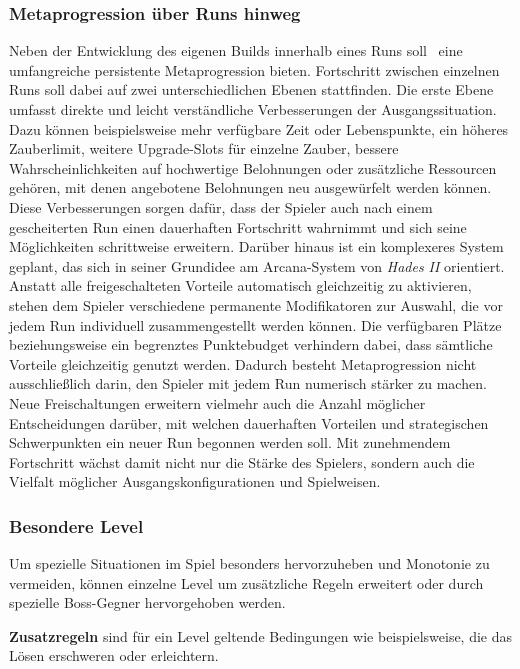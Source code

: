 \subsubsection{Metaprogression über Runs hinweg}
Neben der Entwicklung des eigenen Builds innerhalb eines Runs soll \coc\ eine umfangreiche persistente Metaprogression bieten.
Fortschritt zwischen einzelnen Runs soll dabei auf zwei unterschiedlichen Ebenen stattfinden.
Die erste Ebene umfasst direkte und leicht verständliche Verbesserungen der Ausgangssituation.
Dazu können beispielsweise mehr verfügbare Zeit oder Lebenspunkte, ein höheres Zauberlimit, weitere Upgrade-Slots für einzelne Zauber, bessere Wahrscheinlichkeiten auf hochwertige Belohnungen oder zusätzliche Ressourcen gehören, mit denen angebotene Belohnungen neu ausgewürfelt werden können.
Diese Verbesserungen sorgen dafür, dass der Spieler auch nach einem gescheiterten Run einen dauerhaften Fortschritt wahrnimmt und sich seine Möglichkeiten schrittweise erweitern.
Darüber hinaus ist ein komplexeres System geplant, das sich in seiner Grundidee am Arcana-System von \emph{Hades II} orientiert.
Anstatt alle freigeschalteten Vorteile automatisch gleichzeitig zu aktivieren, stehen dem Spieler verschiedene permanente Modifikatoren zur Auswahl, die vor jedem Run individuell zusammengestellt werden können.
Die verfügbaren Plätze beziehungsweise ein begrenztes Punktebudget verhindern dabei, dass sämtliche Vorteile gleichzeitig genutzt werden.
Dadurch besteht Metaprogression nicht ausschließlich darin, den Spieler mit jedem Run numerisch stärker zu machen.
Neue Freischaltungen erweitern vielmehr auch die Anzahl möglicher Entscheidungen darüber, mit welchen dauerhaften Vorteilen und strategischen Schwerpunkten ein neuer Run begonnen werden soll.
Mit zunehmendem Fortschritt wächst damit nicht nur die Stärke des Spielers, sondern auch die Vielfalt möglicher Ausgangskonfigurationen und Spielweisen.

\subsubsection{Besondere Level}
Um spezielle Situationen im Spiel besonders hervorzuheben und Monotonie zu vermeiden, können einzelne Level um zusätzliche Regeln erweitert oder durch spezielle Boss-Gegner hervorgehoben werden.

\textbf{Zusatzregeln} sind für ein Level geltende Bedingungen wie beispielsweise, die das Lösen erschweren oder erleichtern.

